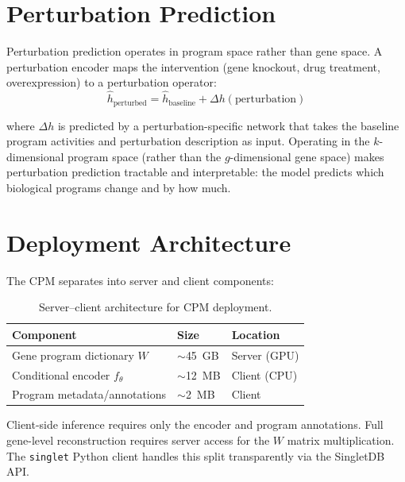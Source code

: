 \documentclass[10pt,twocolumn,letterpaper]{article}
\begin{document}
\section{Perturbation Prediction}
\label{sec:perturbation}

Perturbation prediction operates in program space rather than gene space.
A perturbation encoder maps the intervention (gene knockout, drug treatment,
overexpression) to a perturbation operator:
\begin{equation}
  \hat{h}_{\text{perturbed}} = \hat{h}_{\text{baseline}} + \Delta h(\text{perturbation})
  \label{eq:perturbation}
\end{equation}

where $\Delta h$ is predicted by a perturbation-specific network that takes
the baseline program activities and perturbation description as input. Operating
in the $k$-dimensional program space (rather than the $g$-dimensional gene space)
makes perturbation prediction tractable and interpretable: the model predicts
which biological programs change and by how much.

\section{Deployment Architecture}
\label{sec:deployment}

The CPM separates into server and client components:

\begin{table}[t]
  \centering
  \caption{Server--client architecture for CPM deployment.}
  \label{tab:deployment}
  \small
  \begin{tabular}{@{}lll@{}}
    \toprule
    Component & Size & Location \\
    \midrule
    Gene program dictionary $W$ & $\sim$45~GB & Server (GPU) \\
    Conditional encoder $f_\theta$ & $\sim$12~MB & Client (CPU) \\
    Program metadata/annotations & $\sim$2~MB & Client \\
    \bottomrule
  \end{tabular}
\end{table}

Client-side inference requires only the encoder and program annotations.
Full gene-level reconstruction requires server access for the $W$ matrix
multiplication. The \texttt{singlet} Python client handles this split
transparently via the SingletDB API.
\end{document}
